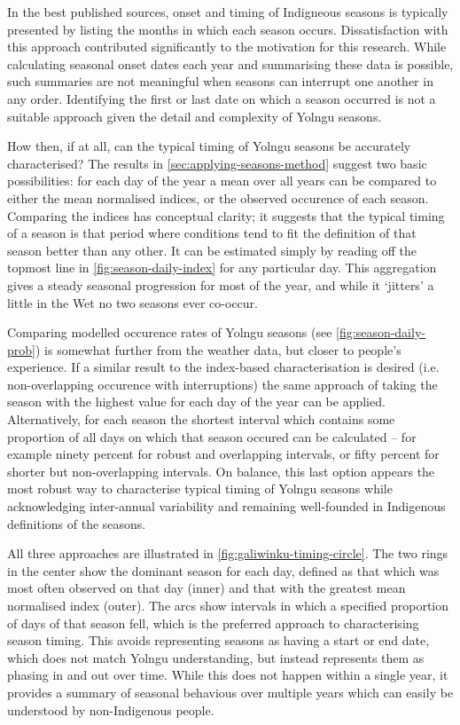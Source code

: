 In the best published sources, onset and timing of Indigneous seasons is typically presented
by listing the months in which each season occurs.  Dissatisfaction with this
approach contributed significantly to the motivation for this research.
%
While calculating seasonal onset dates each year and summarising these data
is possible, such summaries are not meaningful when seasons can interrupt
one another in any order.  Identifying the first or last date on which a
season occurred is not a suitable approach given the detail and complexity of Yolngu seasons.

How then, if at all, can the typical timing of Yolngu seasons be accurately
characterised?  The results in \cref{sec:applying-seasons-method} suggest two
basic possibilities: for each day of the year a mean over all years can be
compared to either the mean normalised indices, or the observed occurence
of each season.
%
Comparing the indices has conceptual clarity; it suggests that the
typical timing of a season is that period where conditions tend to fit the
definition of that season better than any other.  It can be estimated simply
by reading off the topmost line in \cref{fig:season-daily-index} for any
particular day.  This aggregation gives a steady seasonal progression for most of the
year, and while it `jitters' a little in the Wet no two seasons ever co-occur.

Comparing modelled occurence rates of Yolngu seasons (see \cref{fig:season-daily-prob}) is somewhat
further from the weather data, but closer to people's experience.  If a similar
result to the index-based characterisation is desired (i.e. non-overlapping occurence
with interruptions) the same approach of taking the season
with the highest value for each day of the year can be applied.
%
Alternatively, for each season the shortest interval which contains some
proportion of all days on which that season occured can be calculated --
for example ninety percent for robust and overlapping intervals, or fifty percent for
shorter but non-overlapping intervals.  On balance, this last option
appears the most robust way to characterise typical timing of Yolngu seasons while
acknowledging inter-annual variability and remaining well-founded in
Indigenous definitions of the seasons.

All three approaches are illustrated in \cref{fig:galiwinku-timing-circle}.
The two rings in the center show the dominant season for each day, defined as
that which was most often observed on that day (inner) and that with the
greatest mean normalised index (outer).  The arcs show intervals in which a
specified proportion of days of that season fell, which is the preferred
approach to characterising season timing.
%
This avoids representing seasons as having a start or end date, which does
not match Yolngu understanding, but instead represents them as phasing in
and out over time.  While this does not happen within a single year, it
provides a summary of seasonal behavious over multiple years which can easily
be understood by non-Indigenous people.


